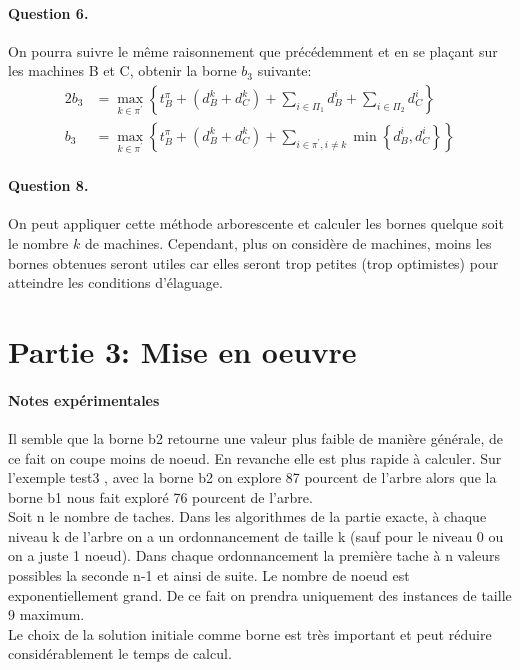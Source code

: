 \documentclass[a4paper, 10pt]{article}
\begin{document}
		\paragraph{Question 6.}{On pourra suivre le même raisonnement que précédemment et en se plaçant sur les machines B et C, obtenir la borne $b_3$ suivante:
		\begin{alignat*}{2}
			b_3 &= \max_{k \in \pi^\prime} \left\{ t^{\pi}_B + \left( d^k_B + d^k_C \right) + \sum_{i \in \Pi_1} d^i_B + \sum_{i \in \Pi_2} d^i_C \right\} \\
			b_3 &= \max_{k \in \pi^\prime} \left\{ t^{\pi}_B + \left( d^k_B + d^k_C \right) + \sum_{i \in \pi^\prime, i \ne k} \min \left\{ d^i_B, d^i_C \right\} \right\}
		\end{alignat*}
		}
		
		\paragraph{Question 8.}{On peut appliquer cette méthode arborescente et calculer les bornes quelque soit le nombre $k$ de machines. Cependant, plus on considère de machines, moins les bornes obtenues seront utiles car elles seront trop petites (trop optimistes) pour atteindre les conditions d'élaguage. 		
		}
		
	        \section*{Partie 3: Mise en oeuvre}
		\paragraph{Notes expérimentales}{Il semble que la borne b2 retourne une valeur plus faible de manière générale, de ce fait on coupe moins de noeud. En revanche elle est plus rapide à calculer. Sur l'exemple test3 , avec la borne b2 on explore 87 pourcent de l'arbre alors que la borne b1 nous fait exploré 76 pourcent de l'arbre. \\
                  Soit n le nombre de taches.
                  Dans les algorithmes de la partie exacte, à chaque niveau k de l'arbre on a un ordonnancement de taille k (sauf pour le niveau 0 ou on a juste 1 noeud). Dans chaque ordonnancement la première tache à n valeurs possibles la seconde n-1 et ainsi de suite. Le nombre de noeud est exponentiellement grand. De ce fait on prendra uniquement des instances de taille 9 maximum. \\
                  Le choix de la solution initiale comme borne est très important et peut réduire considérablement le temps de calcul.
                }
\end{document}
